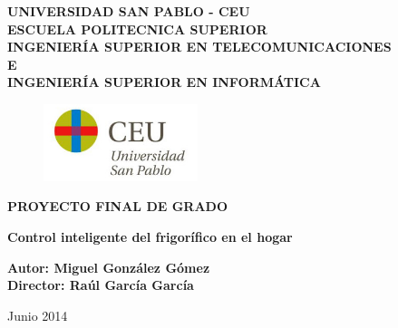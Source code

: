 \begin{titlepage}
\pagestyle{plain} %
\begin{center}
        \Large
        \vspace{1cm}
        \bfseries\textbf{UNIVERSIDAD SAN PABLO - CEU\\}
        \vspace{1cm}
        \large
        \mdseries\textsf{ESCUELA POLITECNICA SUPERIOR\\}
        \vspace{0.5cm}
        \textsf{INGENIERÍA SUPERIOR EN TELECOMUNICACIONES\\
            E\\
            INGENIERÍA SUPERIOR EN INFORMÁTICA}
        \vspace{0.5cm}

        \begin{figure}[htbp]
            \centering
                \includegraphics[width=0.40\textwidth]{CEU_Universidad_San_Pablo.jpg}
            \label{fig:logoceu}
        \end{figure}

        \large
        \vspace*{2cm}
        \bfseries\textbf{PROYECTO FINAL DE GRADO\\}

        \Large
        \vspace*{1.5cm}
        \bfseries\textbf{Control inteligente del frigorífico en el hogar}
        \vspace{1cm}

        \large
        \bfseries\textbf{Autor: Miguel González Gómez\\
        Director: Raúl García García}
        \vspace{1.5cm}


        \mdseries\textsf{Junio 2014}
    \end{center}
\end{titlepage}
